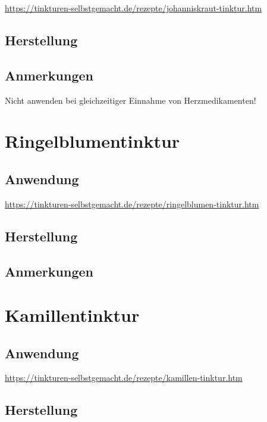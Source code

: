 \cite{tinkturen}  \url{https://tinkturen-selbstgemacht.de/rezepte/johanniskraut-tinktur.htm}

\subsection{Herstellung}

\subsection{Anmerkungen}

Nicht anwenden bei gleichzeitiger Einnahme von Herzmedikamenten!





\section{Ringelblumentinktur}

\subsection{Anwendung}

\cite{tinkturen}  \url{https://tinkturen-selbstgemacht.de/rezepte/ringelblumen-tinktur.htm}

\subsection{Herstellung}

\subsection{Anmerkungen}






\section{Kamillentinktur}

\subsection{Anwendung}

\cite{tinkturen}  \url{https://tinkturen-selbstgemacht.de/rezepte/kamillen-tinktur.htm}

\subsection{Herstellung}

